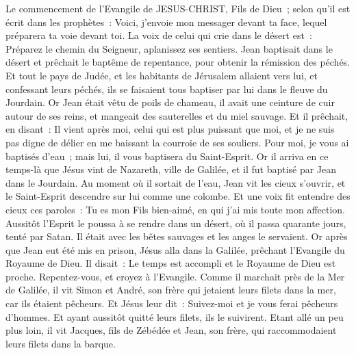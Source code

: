 \begin{multicols}{2}
\VerseOne{}Le commencement de l'Evangile de JESUS-CHRIST, Fils de Dieu~;
selon qu'il est écrit dans les prophètes~: Voici, j'envoie mon messager devant ta face, lequel préparera ta voie devant toi.
La voix de celui qui crie dans le désert est~: Préparez le chemin du Seigneur, aplanissez ses sentiers.
Jean baptisait dans le désert et prêchait le baptême de repentance, pour obtenir la rémission des péchés.
Et tout le pays de Judée, et les habitants de Jérusalem allaient vers lui, et confessant leurs péchés, ils se faisaient tous baptiser par lui dans le fleuve du Jourdain.
Or Jean était vêtu de poils de chameau, il avait une ceinture de cuir autour de ses reins, et mangeait des sauterelles et du miel sauvage.
Et il prêchait, en disant~: Il vient après moi, celui qui est plus puissant que moi, et je ne suis pas digne de délier en me baissant la courroie de ses souliers.
Pour moi, je vous ai baptisés d'eau~; mais lui, il vous baptisera du Saint-Esprit.
Or il arriva en ce temps-là que Jésus vint de Nazareth, ville de Galilée, et il fut baptisé par Jean dans le Jourdain.
Au moment où il sortait de l'eau, Jean vit les cieux s'ouvrir, et le Saint-Esprit descendre sur lui comme une colombe.
Et une voix fit entendre des cieux ces paroles~: Tu es mon Fils bien-aimé, en qui j'ai mis toute mon affection.
Aussitôt l'Esprit le poussa à se rendre dans un désert,
où il passa quarante jours, tenté par Satan. Il était avec les bêtes sauvages et les anges le servaient.
Or après que Jean eut été mis en prison, Jésus alla dans la Galilée, prêchant l'Evangile du Royaume de Dieu.
Il disait~: Le temps est accompli et le Royaume de Dieu est proche. Repentez-vous, et croyez à l'Evangile.
Comme il marchait près de la Mer de Galilée, il vit Simon et André, son frère qui jetaient leurs filets dans la mer, car ils étaient pêcheurs.
Et Jésus leur dit~: Suivez-moi et je vous ferai pêcheurs d'hommes.
Et ayant aussitôt quitté leurs filets, ils le suivirent.
Etant allé un peu plus loin, il vit Jacques, fils de Zébédée et Jean, son frère, qui raccommodaient leurs filets dans la barque.

\end{multicols}
